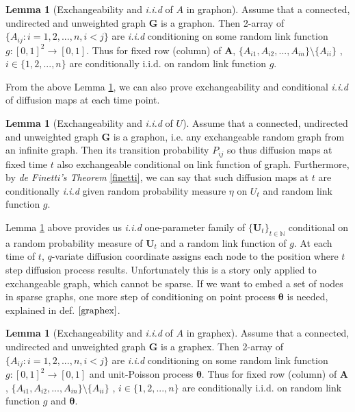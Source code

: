 \documentclass[12pt]{article}
\theoremstyle{definition}
\newtheorem{lemma}[theorem]{Lemma}
\begin{document}
\begin{lemma}[Exchangeability and \textit{i.i.d} of $A$ in graphon]
	\label{lemma1}
Assume that a connected, undirected and unweighted graph $\mathbf{G}$ is a graphon. Then 2-array of $\{ A_{ij} : i = 1,2,... ,n , i < j \}$ are  \textit{i.i.d} conditioning on some random link function $g : [0,1]^2 \rightarrow [0,1]$. Thus for fixed row (column) of $\mathbf{A}$, $\{ A_{i1}, A_{i2}, ... , A_{in} \} \setminus \{ A_{ii} \} $ , $i \in \{ 1,2,... , n \}$ are conditionally i.i.d. on random link function $g$.  
\end{lemma}
		
From the above Lemma \ref{lemma1}, we can also prove exchangeability and conditional \textit{i.i.d} of diffusion maps at each time point. 
	
\begin{lemma}[Exchangeability and \textit{i.i.d} of $U$]
	\label{main_lemma}
	Assume that a connected, undirected and unweighted graph $\mathbf{G}$ is a graphon, i.e. any exchangeable random graph from an infinite graph. Then its transition probability $P_{ij}$ so thus  diffusion maps at fixed time $t$ also exchangeable conditional on link function of graph. Furthermore, by \textit{de Finetti's Theorem} \ref{finetti}, we can say that such diffusion maps at $t$ are conditionally \textit{i.i.d} given random probability measure $\eta$ on $U_{t}$ and random link function $g$.    
\end{lemma}
	
Lemma \ref{main_lemma} above provides us \textit{i.i.d} one-parameter family of $\{ \mathbf{U}_{t} \}_{t \in \mathbb{N}}$ conditional on a random probability measure of $\mathbf{U}_{t}$ and a random link function of $g$. At each time of $t$,  $q$-variate diffusion coordinate assigns each node to the position where $t$ step diffusion process results. Unfortunately this is a story only applied to exchangeable graph, which cannot be sparse. If we want to embed a set of nodes in sparse graphs, one more step of conditioning on point process $\mathbf{\theta}$ is needed, explained in def. $\ref{graphex}$.  
	
	
\begin{lemma}[Exchangeability and \textit{i.i.d} of $A$ in graphex]
\label{lemma2}
Assume that a connected, undirected and unweighted graph $\mathbf{G}$ is a graphex. Then 2-array of $\{ A_{ij} : i = 1,2,... ,n , i < j \}$ are  \textit{i.i.d} conditioning on some random link function $g : [0,1]^2 \rightarrow [0,1]$ and unit-Poisson process $\mathbf{\theta}$. Thus for fixed row (column) of $\mathbf{A}$, $\{ A_{i1}, A_{i2}, ... , A_{in} \} \setminus \{ A_{ii} \} $ , $i \in \{ 1,2,... , n \}$ are conditionally i.i.d. on random link function $g$ and $\mathbf{\theta}$.  
\end{lemma}	
\end{document}
